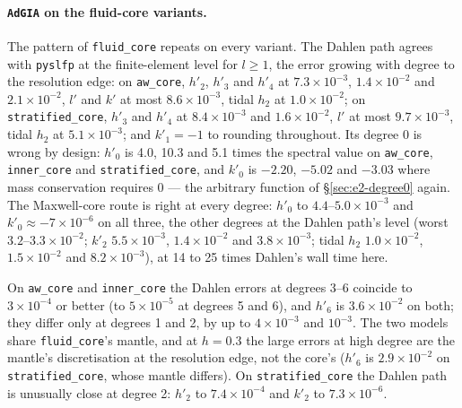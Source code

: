 \documentclass[11pt]{article}
\numberwithin{equation}{section}
\newcommand{\code}[1]{\texttt{#1}}
\begin{document}
\paragraph{\code{AdGIA} on the fluid-core variants.} The pattern of
\code{fluid\_core} repeats on every variant. The Dahlen path agrees with
\code{pyslfp} at the finite-element level for $l\ge1$, the error growing
with degree to the resolution edge: on \code{aw\_core}, $h'_2$, $h'_3$ and
$h'_4$ at $7.3\times10^{-3}$, $1.4\times10^{-2}$ and $2.1\times10^{-2}$,
$l'$ and $k'$ at most $8.6\times10^{-3}$, tidal $h_2$ at
$1.0\times10^{-2}$; on \code{stratified\_core}, $h'_3$ and $h'_4$ at
$8.4\times10^{-3}$ and $1.6\times10^{-2}$, $l'$ at most $9.7\times10^{-3}$,
tidal $h_2$ at $5.1\times10^{-3}$; and $k'_1=-1$ to rounding throughout.
Its degree 0 is wrong by design: $h'_0$ is 4.0, 10.3 and 5.1 times the
spectral value on \code{aw\_core}, \code{inner\_core} and
\code{stratified\_core}, and $k'_0$ is $-2.20$, $-5.02$ and $-3.03$ where
mass conservation requires 0 --- the arbitrary function of
\S\ref{sec:e2-degree0} again. The Maxwell-core route is right at every
degree: $h'_0$ to $4.4$--$5.0\times10^{-3}$ and $k'_0\approx-7\times10^{-6}$
on all three, the other degrees at the Dahlen path's level (worst
$3.2$--$3.3\times10^{-2}$; $k'_2$ $5.5\times10^{-3}$, $1.4\times10^{-2}$
and $3.8\times10^{-3}$; tidal $h_2$ $1.0\times10^{-2}$, $1.5\times10^{-2}$
and $8.2\times10^{-3}$), at 14 to 25 times Dahlen's wall time here.

On \code{aw\_core} and \code{inner\_core} the Dahlen errors at degrees 3--6
coincide to $3\times10^{-4}$ or better (to $5\times10^{-5}$ at degrees 5 and
6), and $h'_6$ is $3.6\times10^{-2}$ on both; they differ only at degrees 1
and 2, by up to $4\times10^{-3}$ and $10^{-3}$. The two models share
\code{fluid\_core}'s mantle, and at $h=0.3$ the large errors at high degree
are the mantle's discretisation at the resolution edge, not the core's
($h'_6$ is $2.9\times10^{-2}$ on \code{stratified\_core}, whose mantle
differs). On \code{stratified\_core} the Dahlen path is unusually close at
degree 2: $h'_2$ to $7.4\times10^{-4}$ and $k'_2$ to $7.3\times10^{-6}$.
\end{document}
